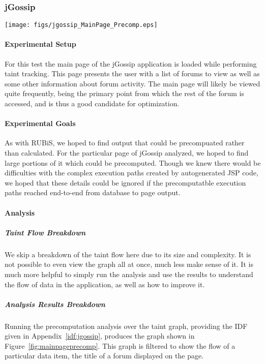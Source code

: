 \documentclass[msc,oneside]{ubcthesis}
\begin{document}
\subsubsection{jGossip} 

\begin{sidewaysfigure}
\centering
\scalebox{0.42}
{\texttt{[image: figs/jgossip\_MainPage\_Precomp.eps]}}
\caption{jGossip Main Page Precomputation Analysis Results.} 
\label{fig:mainpageprecomp}
\end{sidewaysfigure}

\paragraph{Experimental Setup}
For this test the main page of the jGossip application is loaded while performing taint tracking. This page presents the user with a list of forums to view as well as some other information about forum activity. The main page will likely be viewed quite frequently, being the primary point from which the rest of the forum is accessed, and is thus a good candidate for optimization.

\paragraph{Experimental Goals}
As with RUBiS, we hoped to find output that could be precompuated rather than calculated. For the particular page of jGossip analyzed, we hoped to find large portions of it which could be precomputed. Though we knew there would be difficulties with the complex execution paths created by autogenerated JSP code, we hoped that these details could be ignored if the precomputatble execution paths reached end-to-end from database to page output. 

\paragraph{Analysis}
\subparagraph{Taint Flow Breakdown}
We skip a breakdown of the taint flow here due to its size and complexity. It is not possible to even view the graph all at once, much less make sense of it. It is much more helpful to simply run the analysis and use the results to understand the flow of data in the application, as well as how to improve it.

\subparagraph{Analysis Results Breakdown}
Running the precomputation analysis over the taint graph, providing the IDF given in Appendix~\ref{idf:jgossip}, produces the graph shown in Figure~\ref{fig:mainpageprecomp}. This graph is filtered to show the flow of a particular data item, the title of a forum displayed on the page.\\
\end{document}
